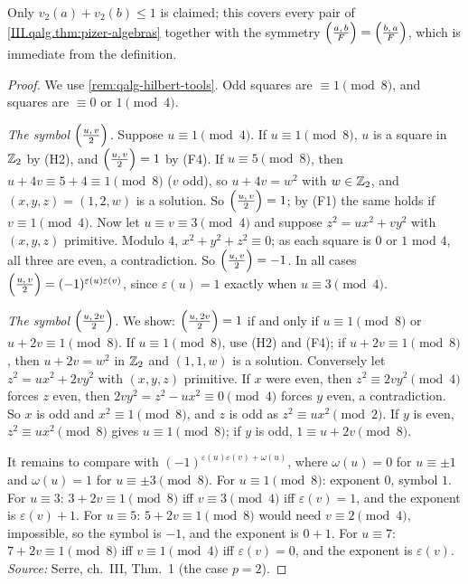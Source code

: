 \begin{theorem}
\end{theorem}
\noindent Only $v_2(a)+v_2(b)\le1$ is claimed; this covers every pair of \cref{III.qalg.thm:pizer-algebras} together with the symmetry
$\Bigl(\tfrac{a,\,b}{F}\Bigr)=\Bigl(\tfrac{b,\,a}{F}\Bigr)$, which is immediate from the definition.
\begin{proof}
We use \cref{rem:qalg-hilbert-tools}. Odd squares are $\equiv1\pmod 8$, and squares are $\equiv0$ or $1\pmod4$.

\emph{The symbol $\Bigl(\tfrac{u,\,v}{2}\Bigr)$.} Suppose $u\equiv1\pmod4$. If $u\equiv1\pmod8$, $u$ is a square in $\mathbb{Z}_2$ by (H2), and $\Bigl(\tfrac{u,\,v}{2}\Bigr)=1$ by (F4). If
$u\equiv5\pmod8$, then $u+4v\equiv5+4\equiv1\pmod8$ ($v$ odd), so $u+4v=w^2$ with $w\in\mathbb{Z}_2$, and $(x,y,z)=(1,2,w)$ is a solution. So
$\Bigl(\tfrac{u,\,v}{2}\Bigr)=1$; by (F1) the same holds if $v\equiv1\pmod 4$. Now let $u\equiv v\equiv3\pmod4$ and suppose $z^2=ux^2+vy^2$ with $(x,y,z)$ primitive.
Modulo $4$, $x^2+y^2+z^2\equiv0$; as each square is $0$ or $1$ mod $4$, all three are even, a contradiction. So $\Bigl(\tfrac{u,\,v}{2}\Bigr)=-1$. In all cases
$\Bigl(\tfrac{u,\,v}{2}\Bigr)=(-1)^{\varepsilon(u)\varepsilon(v)}$, since $\varepsilon(u)=1$ exactly when $u\equiv3\pmod 4$.

\emph{The symbol $\Bigl(\tfrac{u,\,2v}{2}\Bigr)$.} We show: $\Bigl(\tfrac{u,\,2v}{2}\Bigr)=1$ if and only if $u\equiv1\pmod 8$ or $u+2v\equiv1\pmod8$. If $u\equiv1\pmod8$, use (H2) and
(F4); if $u+2v\equiv1\pmod 8$, then $u+2v=w^2$ in $\mathbb{Z}_2$ and $(1,1,w)$ is a solution. Conversely let $z^2=ux^2+2vy^2$ with $(x,y,z)$ primitive. If $x$
were even, then $z^2\equiv2vy^2\pmod 4$ forces $z$ even, then $2vy^2=z^2-ux^2\equiv0\pmod4$ forces $y$ even, a contradiction. So $x$ is odd and $x^2\equiv1
\pmod 8$, and $z$ is odd as $z^2\equiv ux^2\pmod 2$. If $y$ is even, $z^2\equiv ux^2\pmod 8$ gives $u\equiv1\pmod8$; if $y$ is odd, $1\equiv u+2v\pmod 8$.

It remains to compare with $(-1)^{\varepsilon(u)\varepsilon(v)+\omega(u)}$, where $\omega(u)=0$ for $u\equiv\pm1$ and $\omega(u)=1$ for $u\equiv\pm3\pmod8$.
For $u\equiv1\pmod8$: exponent $0$, symbol $1$. For $u\equiv3$: $3+2v\equiv1\pmod 8$ iff $v\equiv3\pmod4$ iff $\varepsilon(v)=1$, and the exponent is
$\varepsilon(v)+1$. For $u\equiv5$: $5+2v\equiv1\pmod8$ would need $v\equiv2\pmod 4$, impossible, so the symbol is $-1$, and the exponent is $0+1$. For
$u\equiv7$: $7+2v\equiv1\pmod 8$ iff $v\equiv1\pmod4$ iff $\varepsilon(v)=0$, and the exponent is $\varepsilon(v)$. \emph{Source:} Serre, ch.~III,
Thm.~1 (the case $p=2$).
\end{proof}

